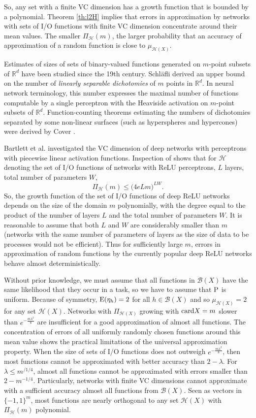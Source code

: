 \documentclass{elsarticle}
\def\n{\noindent}
\def\card{{\rm card}}
\def\P{{\rm P}}
\def\E{{\rm E}}
\def\cH{{\mathcal H}}
\def\cB{{\mathcal B}}
\def\bR{{\mathbb R}}
\def\n{\noindent}
\def\card{{\rm card}}
\begin{document}
\n So, any set with a finite VC dimension has a growth function that is bounded by a polynomial. Theorem \ref{th:l2H} implies that errors in approximation by networks with sets of I/O functions with finite VC dimension concentrate around their mean values. The smaller $\Pi_{\cH}(m)$, the larger probability that an accuracy of approximation of a random function is close to $\mu_{\cH(X)}$.

Estimates of sizes of sets of binary-valued functions generated on $m$-point subsets of $\bR^d$ have been studied since the 19th century. Schl\"{a}fli \cite{sc01,sc50} derived an upper bound on the number of {\em linearly separable dichotomies} of $m$ points in $\bR^d$. In neural network terminology, this number expresses the maximal number of functions computable by a single perceptron with the Heaviside activation on $m$-point subsets of $\bR^d$. Function-counting theorems estimating the numbers of dichotomies separated by some
non-linear surfaces (such as hyperspheres and hypercones) were derived by Cover \cite{co65}.

Bartlett et al. \cite{baal98,baal19} investigated the VC dimension of deep networks with perceptrons with piecewise linear activation functions. Inspection of \cite[Theorem 7 and Remark 9]{baal19} shows that for $\cH$ denoting the set of I/O functions of networks with ReLU perceptrons, $L$ layers, total number of parameters $W$,
$$\Pi_{\cH}(m) \leq \bigl( 4eLm \bigr )^{LW}.$$
\n So, the growth function of the set of I/O functions of deep ReLU networks depends on the size of the domain $m$ polynomially, with the degree equal to  the product of the number of layers $L$ and the total number of parameters $W$. It is reasonable to assume that both  $L$ and $W$ are considerably smaller than $m$ (networks with the same number of parameters of layers as the size of data to be processes would not be efficient). Thus for sufficiently large $m$, errors in approximation of random functions by the currently popular deep ReLU networks behave almost deterministically.

Without prior knowledge, we must assume that all functions in $\cB(X)$ have the same likelihood that they occur in a task, so we have to assume that $\P$ is uniform. Because of symmetry, $\E(\eta_h)= 2$  for all $h \in \cB(X)$ and so $\mu_{\cH(X)}=2$ for any set $\cH(X)$.  Networks with $\Pi_{\cH(X)}$ growing with $\card X =m$ slower than $e^{-\frac{m{\lambda}^2}{8}}$ are insufficient for a good approximation of almost all functions. The concentration of errors of all uniformly randomly chosen functions around this mean value shows the practical limitations of the universal approximation property. When the size of sets of I/O functions does not outweigh $e^{-\frac{m{\lambda}^2}{8}}$, then most functions cannot be approximated with better accuracy than $2-\lambda$. For $\lambda \leq m^{/1/4}$, almost all functions cannot be approximated with errors smaller than $2 - m^{-1/4}$.
Particularly,  networks with finite VC dimensions cannot approximate with a sufficient accuracy almost all functions from $\cB(X)$. Seen as vectors in $\{-1,1\}^m$, most functions are nearly orthogonal to any set $\cH(X)$ with $\Pi_{\cH}(m)$ polynomial.
\end{document}
